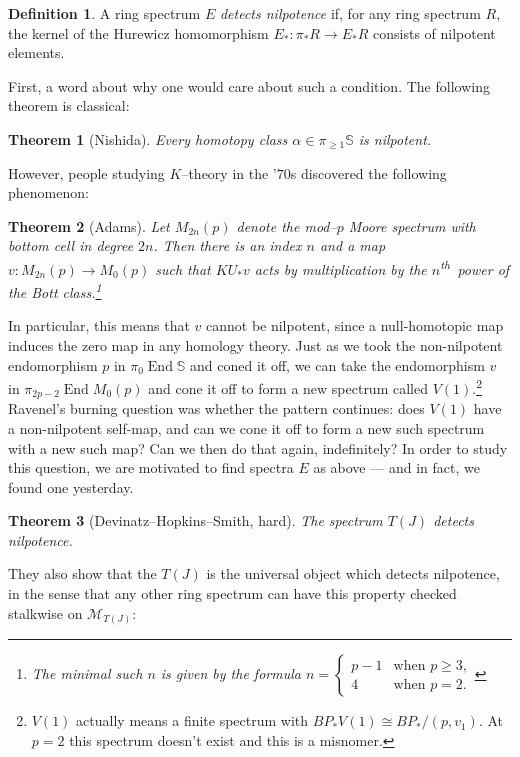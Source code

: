 \documentclass{amsart}
\renewcommand{\S}{\mathbb S}
\newcommand{\M}{\mathcal{M}}
\newcommand{\<}{\langle}
\renewcommand{\>}{\rangle}
\DeclareMathOperator{\End}{End}
\theoremstyle{plain}
\newtheorem*{theorem}{Theorem}
\theoremstyle{definition}
\newtheorem*{definition}{Definition}
\theoremstyle{remark}
\begin{document}
\begin{definition}
A ring spectrum $E$ \textit{detects nilpotence} if, for any ring spectrum $R$, the kernel of the Hurewicz homomorphism $E_*: \pi_* R \to E_* R$ consists of nilpotent elements.
\end{definition}

First, a word about why one would care about such a condition.  The following theorem is classical:
\begin{theorem}[Nishida]
Every homotopy class $\alpha \in \pi_{\ge 1} \S$ is nilpotent.
\end{theorem}

\noindent However, people studying $K$--theory in the '$70$s discovered the following phenomenon:

\begin{theorem}[Adams]
Let $M_{2n}(p)$ denote the mod--$p$ Moore spectrum with bottom cell in degree $2n$.  Then there is an index $n$ and a map $v: M_{2n}(p) \to M_0(p)$ such that $KU_* v$ acts by multiplication by the $n$\textsuperscript{th}\, power of the Bott class.\footnote{The minimal such $n$ is given by the formula $n = \begin{cases} p-1 & \text{when $p \ge 3$}, \\ 4 & \text{when $p = 2$}. \end{cases}$}
\end{theorem}

\noindent In particular, this means that $v$ cannot be nilpotent, since a null-homotopic map induces the zero map in any homology theory.  Just as we took the non-nilpotent endomorphism $p$ in $\pi_0 \End \S$ and coned it off, we can take the endomorphism $v$ in $\pi_{2p-2} \End M_0(p)$ and cone it off to form a new spectrum called $V(1)$.\footnote{$V(1)$ actually means a finite spectrum with $BP_* V(1) \cong BP_* / (p, v_1)$. At $p = 2$ this spectrum doesn't exist and this is a misnomer.}  Ravenel's burning question was whether the pattern continues: does $V(1)$ have a non-nilpotent self-map, and can we cone it off to form a new such spectrum with a new such map?  Can we then do that again, indefinitely?  In order to study this question, we are motivated to find spectra $E$ as above --- and in fact, we found one yesterday.

\begin{theorem}[Devinatz--Hopkins--Smith, hard]
The spectrum $T(J)$ detects nilpotence.
\end{theorem}

They also show that the $T(J)$ is the universal object which detects nilpotence, in the sense that any other ring spectrum can have this property checked stalkwise on $\M_{T(J)}$:
\end{document}
